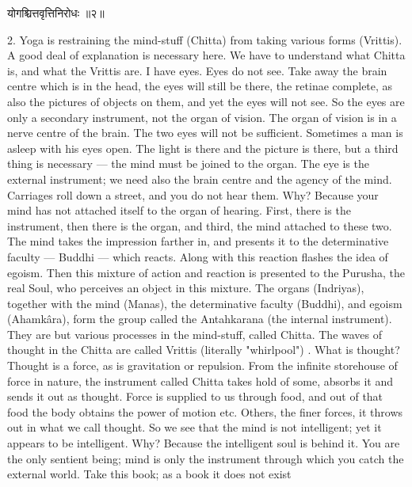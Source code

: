 \begin{center}
\begin{sanskrit}
योगश्चित्तवृत्तिनिरोधः ॥२॥
\end{sanskrit}
\end{center}
2. Yoga is restraining the mind-stuff (Chitta) from taking
various forms (Vrittis). \\

A good deal of explanation is necessary here. We have to
understand what Chitta is, and what the Vrittis are. I have eyes. Eyes
do not see. Take away the brain centre which is in the head, the eyes
will still be there, the retinae complete, as also the pictures of
objects on them, and yet the eyes will not see. So the eyes are only a
secondary instrument, not the organ of vision. The organ of vision is
in a nerve centre of the brain. The two eyes will not be sufficient.
Sometimes a man is asleep with his eyes open. The light is there and
the picture is there, but a third thing is necessary — the mind must be
joined to the organ. The eye is the external instrument; we need also
the brain centre and the agency of the mind. Carriages roll down a
street, and you do not hear them. Why? Because your mind has not
attached itself to the organ of hearing. First, there is the
instrument, then there is the organ, and third, the mind attached to
these two. The mind takes the impression farther in, and presents it to
the determinative faculty — Buddhi — which reacts. Along with this
reaction flashes the idea of egoism. Then this mixture of action and
reaction is presented to the
Purusha, the real Soul, who perceives an object in this mixture. The
organs (Indriyas), together with the mind (Manas), the determinative
faculty (Buddhi), and egoism (Ahamkâra), form the group called the
Antahkarana (the internal instrument). They are but various processes
in the mind-stuff, called Chitta. The waves of thought in the Chitta
are called Vrittis (literally "whirlpool") . What is thought? Thought
is a force, as is gravitation or repulsion. From the infinite
storehouse of force in nature, the instrument called Chitta takes hold
of some, absorbs it and sends it out as thought. Force is supplied to
us through food, and out of that food the body obtains the power of
motion etc. Others, the finer forces, it throws out in what we call
thought. So we see that the mind is not intelligent; yet it appears to
be intelligent. Why? Because the intelligent soul is behind it. You are
the only sentient being; mind is only the instrument through which you
catch the external world. Take this book; as a book it does not exist

